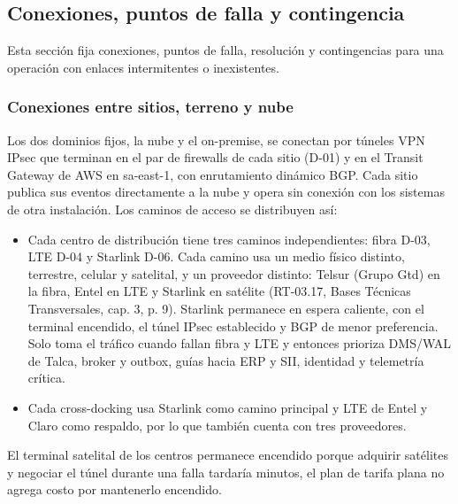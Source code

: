 %

\subsection{Conexiones, puntos de falla y contingencia}
\label{fuente-02-c-conexiones}
\label{sec:conexiones}

Esta sección fija conexiones, puntos de falla, resolución y contingencias para una operación con enlaces intermitentes o inexistentes.

\subsubsection{Conexiones entre sitios, terreno y nube}

Los dos dominios fijos, la nube y el on-premise, se conectan por túneles VPN IPsec que terminan en el par de firewalls de cada sitio (D-01) y en el Transit Gateway de AWS en sa-east-1, con enrutamiento dinámico BGP. Cada sitio publica sus eventos directamente a la nube y opera sin conexión con los sistemas de otra instalación. Los caminos de acceso se distribuyen así:

\begin{itemize}
  \item Cada centro de distribución tiene tres caminos independientes: fibra D-03, LTE D-04 y Starlink D-06. Cada camino usa un medio físico distinto, terrestre, celular y satelital, y un proveedor distinto: Telsur (Grupo Gtd) en la fibra, Entel en LTE y Starlink en satélite (RT-03.17, Bases Técnicas Transversales, cap. 3, p. 9). Starlink permanece en espera caliente, con el terminal encendido, el túnel IPsec establecido y BGP de menor preferencia. Solo toma el tráfico cuando fallan fibra y LTE y entonces prioriza DMS/WAL de Talca, broker y outbox, guías hacia ERP y SII, identidad y telemetría crítica.
  \item Cada cross-docking usa Starlink como camino principal y LTE de Entel y Claro como respaldo, por lo que también cuenta con tres proveedores.
\end{itemize}

El terminal satelital de los centros permanece encendido porque adquirir satélites y negociar el túnel durante una falla tardaría minutos, el plan de tarifa plana no agrega costo por mantenerlo encendido.

